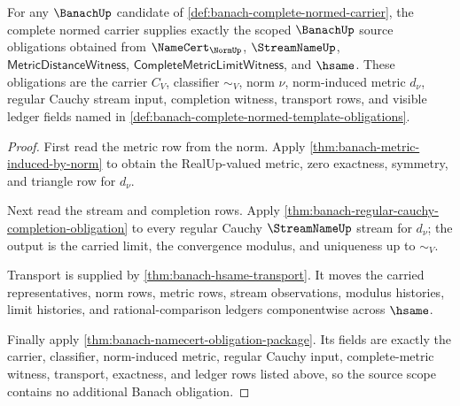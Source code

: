 \begin{theorem}
\label{thm:banach-norm-completion-source-scope}
For any $\BanachUp$ candidate of
\autoref{def:banach-complete-normed-carrier}, the complete normed carrier
supplies exactly the scoped $\BanachUp$ source obligations obtained from
$\NameCert_{\NormUp}$, $\StreamNameUp$, $\mathsf{MetricDistanceWitness}$,
$\mathsf{CompleteMetricLimitWitness}$, and $\hsame$. These obligations are
the carrier $C_V$, classifier $\sim_V$, norm $\nu$, norm-induced metric
$d_\nu$, regular Cauchy stream input, completion witness, transport rows, and
visible ledger fields named in
\autoref{def:banach-complete-normed-template-obligations}.
\end{theorem}
\begin{proof}
First read the metric row from the norm. Apply
\autoref{thm:banach-metric-induced-by-norm} to obtain the RealUp-valued
metric, zero exactness, symmetry, and triangle row for $d_\nu$.

Next read the stream and completion rows. Apply
\autoref{thm:banach-regular-cauchy-completion-obligation} to every regular
Cauchy $\StreamNameUp$ stream for $d_\nu$; the output is the carried limit,
the convergence modulus, and uniqueness up to $\sim_V$.

Transport is supplied by \autoref{thm:banach-hsame-transport}. It moves the
carried representatives, norm rows, metric rows, stream observations, modulus
histories, limit histories, and rational-comparison ledgers componentwise
across $\hsame$.

Finally apply \autoref{thm:banach-namecert-obligation-package}. Its fields
are exactly the carrier, classifier, norm-induced metric, regular Cauchy
input, complete-metric witness, transport, exactness, and ledger rows listed
above, so the source scope contains no additional Banach obligation.
\end{proof}


